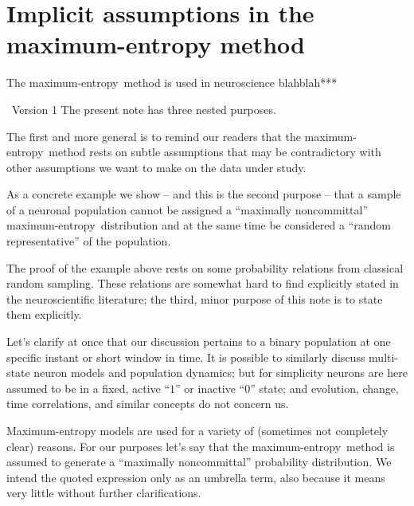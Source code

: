 \documentclass{article}
\title{\pdftitle}
\author{
  V. Rostami\\Hitlerland\\\texttt{v.rostami@fz-juelich.de}
  \And
  P.G.L. Porta Mana\\Mussoliniland\\\texttt{pgl@portamana.org}
  \And
E. Torre\\Moneylaunderingland  
}
\theoremstyle{remark}
\theoremstyle{innote}
\newcommand*{\citep}{\parencites}
\renewcommand*{\cite}{\citep}
\renewcommand*{\|}{\mathpunct{|}}%
\theoremstyle{simple}
\newcommand*{\puzzle}{{\fontencoding{U}\fontfamily{fontawesometwo}\selectfont\symbol{225}}}
\newcommand{\mynote}[1]{ {\color{notecolour}\puzzle\ #1}}
\newcommand*{\me}{maximum-entropy}
\begin{document}

\maketitle

\begin{abstract}
  ***%
\end{abstract}

\section{Implicit assumptions in the maximum-entropy method}

The \me\ method is used in neuroscience blahblah***

\mynote{Version 1}
The present note has three nested purposes.

The first and more general is to remind our readers that the \me\ method
rests on subtle assumptions that may be contradictory with other
assumptions we want to make on the data under study.

As a concrete example we show -- and this is the second purpose -- that a
sample of a neuronal population cannot be assigned a \enquote{maximally
  noncommittal} \me\ distribution and at the same time be considered a
\enquote{random representative} of the population.

The proof of the example above rests on some probability relations from
classical random sampling. These relations are somewhat hard to find
explicitly stated in the neuroscientific literature; the third, minor
purpose of this note is to state them explicitly.


Let's clarify at once that our discussion pertains to a binary population at
one specific instant or short window in time. It is possible to
similarly discuss multi-state neuron models and population dynamics; but for
simplicity neurons are here assumed to be in a fixed, active \enquote{$1$}
or inactive \enquote{$0$} state; and evolution, change, time correlations,
and similar concepts do not concern us.


Maximum-entropy models are used for a variety of (sometimes not completely
clear) reasons. For our purposes let's say that the \me\ method is assumed
to generate a \enquote{maximally noncommittal} \cite{jaynes1963} probability
distribution. We intend the quoted expression only as an umbrella term,
also because it means very little without further clarifications.
\end{document}
